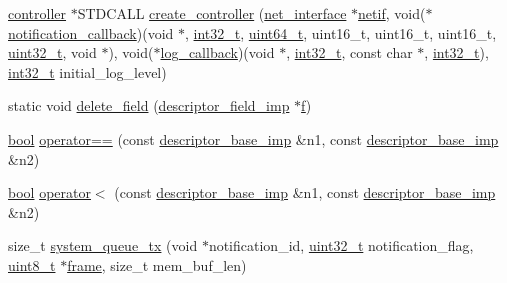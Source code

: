 \begin{DoxyCompactItemize}
\item 
\hyperlink{classavdecc__lib_1_1controller}{controller} $\ast$S\+T\+D\+C\+A\+LL \hyperlink{namespaceavdecc__lib_a4916fb5f28d3347dbe215b599e217354}{create\+\_\+controller} (\hyperlink{classavdecc__lib_1_1net__interface}{net\+\_\+interface} $\ast$\hyperlink{structnetif}{netif}, void($\ast$\hyperlink{notification__main_8cpp_a0ac846a129e0f5cc0f199a57f19dcdf0}{notification\+\_\+callback})(void $\ast$, \hyperlink{parse_8c_a37994e3b11c72957c6f454c6ec96d43d}{int32\+\_\+t}, \hyperlink{parse_8c_aec6fcb673ff035718c238c8c9d544c47}{uint64\+\_\+t}, uint16\+\_\+t, uint16\+\_\+t, uint16\+\_\+t, \hyperlink{parse_8c_a6eb1e68cc391dd753bc8ce896dbb8315}{uint32\+\_\+t}, void $\ast$), void($\ast$\hyperlink{log__main_8cpp_ada1b24c3a6e3b693689b6af49d269216}{log\+\_\+callback})(void $\ast$, \hyperlink{parse_8c_a37994e3b11c72957c6f454c6ec96d43d}{int32\+\_\+t}, const char $\ast$, \hyperlink{parse_8c_a37994e3b11c72957c6f454c6ec96d43d}{int32\+\_\+t}), \hyperlink{parse_8c_a37994e3b11c72957c6f454c6ec96d43d}{int32\+\_\+t} initial\+\_\+log\+\_\+level)
\item 
static void \hyperlink{namespaceavdecc__lib_a289a5528f8572c2f4eb6c345f2cf847e}{delete\+\_\+field} (\hyperlink{classavdecc__lib_1_1descriptor__field__imp}{descriptor\+\_\+field\+\_\+imp} $\ast$\hyperlink{_i_e_e_e754_plugin_test__c_8c_ac9a1bf077a6110a5f27b9bdd6030aa83}{f})
\item 
\hyperlink{avb__gptp_8h_af6a258d8f3ee5206d682d799316314b1}{bool} \hyperlink{namespaceavdecc__lib_ab5494330636994b944b5172f79957ecd}{operator==} (const \hyperlink{classavdecc__lib_1_1descriptor__base__imp}{descriptor\+\_\+base\+\_\+imp} \&n1, const \hyperlink{classavdecc__lib_1_1descriptor__base__imp}{descriptor\+\_\+base\+\_\+imp} \&n2)
\item 
\hyperlink{avb__gptp_8h_af6a258d8f3ee5206d682d799316314b1}{bool} \hyperlink{namespaceavdecc__lib_a93f0471b24f3c5ecbbf0d35157685961}{operator$<$} (const \hyperlink{classavdecc__lib_1_1descriptor__base__imp}{descriptor\+\_\+base\+\_\+imp} \&n1, const \hyperlink{classavdecc__lib_1_1descriptor__base__imp}{descriptor\+\_\+base\+\_\+imp} \&n2)
\item 
size\+\_\+t \hyperlink{namespaceavdecc__lib_a6dd511685627c0865a3442b539a4e8e9}{system\+\_\+queue\+\_\+tx} (void $\ast$notification\+\_\+id, \hyperlink{parse_8c_a6eb1e68cc391dd753bc8ce896dbb8315}{uint32\+\_\+t} notification\+\_\+flag, \hyperlink{stdint_8h_aba7bc1797add20fe3efdf37ced1182c5}{uint8\+\_\+t} $\ast$\hyperlink{gst__avb__playbin_8c_ac8e710e0b5e994c0545d75d69868c6f0}{frame}, size\+\_\+t mem\+\_\+buf\+\_\+len)

\end{DoxyCompactItemize}
